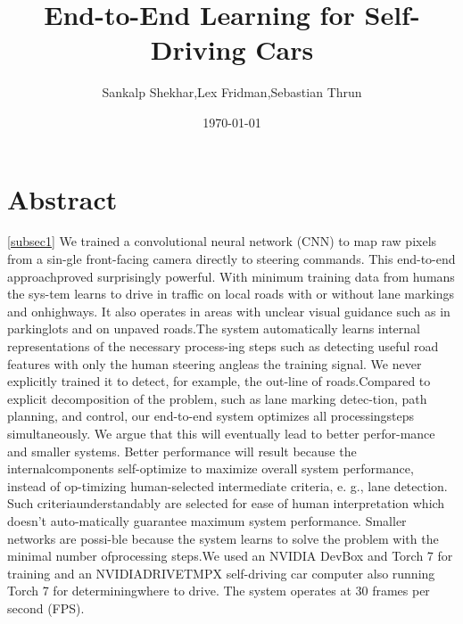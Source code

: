 \documentclass[a4paper]{article}
\begin{document}
		\title{End-to-End Learning for Self-Driving Cars}
		\author{Sankalp Shekhar,Lex Fridman,Sebastian Thrun}
		\date{\today}
		\maketitle
		\tableofcontents
		\newpage
		\section{Abstract}
		 \ref{subsec1} We trained a convolutional neural network (CNN) to map raw pixels from a sin-gle front-facing camera directly to steering commands. This end-to-end approachproved surprisingly powerful. With minimum training data from humans the sys-tem learns to drive in traffic on local roads with or without lane markings and onhighways. It also operates in areas with unclear visual guidance such as in parkinglots and on unpaved roads.The system automatically learns internal representations of the necessary process-ing steps such as detecting useful road features with only the human steering angleas the training signal. We never explicitly trained it to detect, for example, the out-line of roads.Compared to explicit decomposition of the problem, such as lane marking detec-tion, path planning, and control, our end-to-end system optimizes all processingsteps  simultaneously.   We  argue  that  this  will  eventually  lead  to  better  perfor-mance and smaller systems.  Better performance will result because the internalcomponents self-optimize to maximize overall system performance, instead of op-timizing human-selected intermediate criteria, e. g., lane detection.  Such criteriaunderstandably are selected for ease of human interpretation which doesn’t auto-matically guarantee maximum system performance.  Smaller networks are possi-ble because the system learns to solve the problem with the minimal number ofprocessing steps.We  used  an  NVIDIA  DevBox  and  Torch  7  for  training  and  an  NVIDIADRIVETMPX  self-driving  car  computer  also  running  Torch  7  for  determiningwhere to drive. The system operates at 30 frames per second (FPS).
		\newpage
\end{document}
